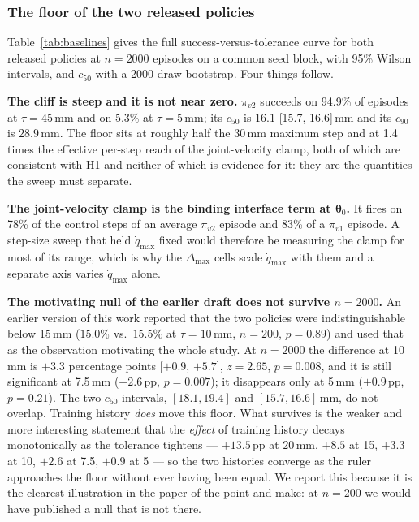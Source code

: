 \documentclass{article}
\newcommand{\dmax}{\Delta_{\max}}
\newcommand{\qdmax}{\dot q_{\max}}
\newcommand{\iface}{\boldsymbol{\theta}}
\begin{document}
\subsubsection{The floor of the two released policies}
\label{sec:baselines}



Table~\ref{tab:baselines} gives the full success-versus-tolerance curve for both
released policies at $n{=}2000$ episodes on a common seed block, with 95\%
Wilson intervals, and $c_{50}$ with a 2000-draw bootstrap. Four things follow.

\textbf{The cliff is steep and it is not near zero.} $\pi_{v2}$ succeeds on
94.9\% of episodes at $\tau{=}45$\,mm and on 5.3\% at $\tau{=}5$\,mm; its
$c_{50}$ is $16.1$ [15.7, 16.6]\,mm and its $c_{90}$ is $28.9$\,mm. The floor
sits at roughly half the 30\,mm maximum step and at 1.4 times the effective
per-step reach of the joint-velocity clamp, both of which are consistent with
H1 and neither of which is evidence for it: they are the quantities the sweep
must separate.

\textbf{The joint-velocity clamp is the binding interface term at $\iface_0$.}
It fires on 78\% of the control steps of an average $\pi_{v2}$ episode and 83\%
of a $\pi_{v1}$ episode. A step-size sweep that held $\qdmax$ fixed would
therefore be measuring the clamp for most of its range, which is why the
$\dmax$ cells scale $\qdmax$ with them and a separate axis varies $\qdmax$
alone.

\textbf{The motivating null of the earlier draft does not survive $n{=}2000$.}
An earlier version of this work reported that the two policies were
indistinguishable below 15\,mm ($15.0\%$ vs.\ $15.5\%$ at $\tau{=}10$\,mm,
$n{=}200$, $p{=}0.89$) and used that as the observation motivating the whole
study. At $n{=}2000$ the difference at 10\,mm is $+3.3$ percentage points
[$+0.9$, $+5.7$], $z{=}2.65$, $p{=}0.008$, and it is still significant at
7.5\,mm ($+2.6$\,pp, $p{=}0.007$); it disappears only at 5\,mm ($+0.9$\,pp,
$p{=}0.21$). The two $c_{50}$ intervals, $[18.1, 19.4]$ and $[15.7, 16.6]$\,mm,
do not overlap. Training history \emph{does} move this floor. What survives is
the weaker and more interesting statement that the \emph{effect} of training
history decays monotonically as the tolerance tightens --- $+13.5$\,pp at
20\,mm, $+8.5$ at 15, $+3.3$ at 10, $+2.6$ at 7.5, $+0.9$ at 5 --- so the two
histories converge as the ruler approaches the floor without ever having been
equal. We report this because it is the clearest illustration in the paper of
the point \citet{jiang2026benchmarking} and \citet{snyder2025step} make: at
$n{=}200$ we would have published a null that is not there.
\end{document}

